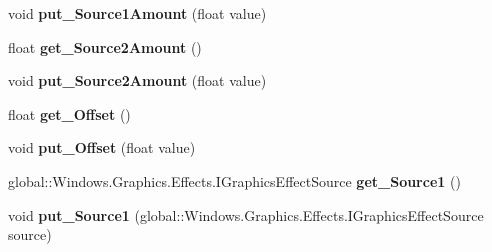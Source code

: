 \begin{DoxyCompactItemize}
void {\bfseries put\+\_\+\+Source1\+Amount} (float value)
\item 
\mbox{\label{class_microsoft_1_1_graphics_1_1_canvas_1_1_effects_1_1_arithmetic_composite_effect_adf15197bc98dd8f06bc3df1765d6588a}} 
float {\bfseries get\+\_\+\+Source2\+Amount} ()
\item 
\mbox{\label{class_microsoft_1_1_graphics_1_1_canvas_1_1_effects_1_1_arithmetic_composite_effect_a0347efa3cb7edaccc8f68ff9b9a1bf4c}} 
void {\bfseries put\+\_\+\+Source2\+Amount} (float value)
\item 
\mbox{\label{class_microsoft_1_1_graphics_1_1_canvas_1_1_effects_1_1_arithmetic_composite_effect_a957330b37ee0c41f98f12755d32b3d7a}} 
float {\bfseries get\+\_\+\+Offset} ()
\item 
\mbox{\label{class_microsoft_1_1_graphics_1_1_canvas_1_1_effects_1_1_arithmetic_composite_effect_a1a67e5996a5094679fc6468a213802fb}} 
void {\bfseries put\+\_\+\+Offset} (float value)
\item 
\mbox{\label{class_microsoft_1_1_graphics_1_1_canvas_1_1_effects_1_1_arithmetic_composite_effect_a22435f1073204355c7988e4add4dadcf}} 
global\+::\+Windows.\+Graphics.\+Effects.\+I\+Graphics\+Effect\+Source {\bfseries get\+\_\+\+Source1} ()
\item 
\mbox{\label{class_microsoft_1_1_graphics_1_1_canvas_1_1_effects_1_1_arithmetic_composite_effect_ab58ad1e3f7ba895ee9a6b8ddb6257ed8}} 
void {\bfseries put\+\_\+\+Source1} (global\+::\+Windows.\+Graphics.\+Effects.\+I\+Graphics\+Effect\+Source source)
\item 
\mbox{\label{class_microsoft_1_1_graphics_1_1_canvas_1_1_effects_1_1_arithmetic_composite_effect_a41be28cb5fe0518e3be3a935ee4dc58d}} 

\end{DoxyCompactItemize}
